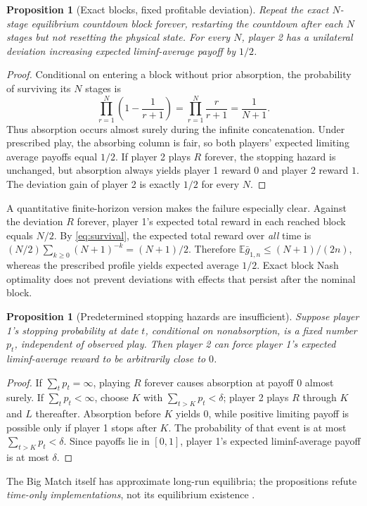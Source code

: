 \documentclass[11pt,a4paper]{article}
\numberwithin{equation}{section}
\newtheorem{proposition}[theorem]{Proposition}
\theoremstyle{definition}
\theoremstyle{remark}
\newcommand{\E}{\mathbb E}
\begin{document}
\begin{proposition}[Exact blocks, fixed profitable deviation]
\label{prop:bigmatch}
Repeat the exact $N$-stage equilibrium countdown block forever, restarting
the countdown after each $N$ stages but not resetting the physical state.
For every $N$, player 2 has a unilateral deviation increasing expected
liminf-average payoff by $1/2$.
\end{proposition}
\begin{proof}
Conditional on entering a block without prior absorption, the probability
of surviving its $N$ stages is
\begin{equation}\label{eq:survival}
 \prod_{r=1}^N\left(1-\frac1{r+1}\right)
 =\prod_{r=1}^N\frac r{r+1}=\frac1{N+1}.
\end{equation}
Thus absorption occurs almost surely during the infinite concatenation.
Under prescribed play, the absorbing column is fair, so both players'
expected limiting average payoffs equal $1/2$. If player 2 plays $R$
forever, the stopping hazard is unchanged, but absorption always yields
player 1 reward $0$ and player 2 reward $1$. The deviation gain of player 2
is exactly $1/2$ for every $N$.
\end{proof}
A quantitative finite-horizon version makes the failure especially clear.
Against the deviation $R$ forever, player 1's expected total reward in
each reached block equals $N/2$. By \eqref{eq:survival}, the expected total
reward over \emph{all} time is $(N/2)\sum_{k\ge0}(N+1)^{-k}=(N+1)/2$.
Therefore $\E\bar g_{1,n}\le(N+1)/(2n)$, whereas the prescribed
profile yields expected average $1/2$. Exact block Nash optimality does
not prevent deviations with effects that persist after the nominal block.

\begin{proposition}[Predetermined stopping hazards are insufficient]
\label{prop:hazard}
Suppose player 1's stopping probability at date $t$, conditional on
nonabsorption, is a fixed number $p_t$, independent of observed play.
Then player 2 can force player 1's \emph{expected liminf-average reward}
to be arbitrarily close to $0$.
\end{proposition}
\begin{proof}
If $\sum_t p_t=\infty$, playing $R$ forever causes absorption at payoff
$0$ almost surely. If $\sum_t p_t<\infty$, choose $K$ with
$\sum_{t>K}p_t<\delta$; player 2 plays $R$ through $K$ and $L$
thereafter. Absorption before $K$ yields $0$, while positive limiting
payoff is possible only if player 1 stops after $K$. The probability of
that event is at most $\sum_{t>K}p_t<\delta$. Since payoffs lie in
$[0,1]$, player 1's expected liminf-average payoff is at most $\delta$.
\end{proof}
The Big Match itself has approximate long-run equilibria; the propositions
refute \emph{time-only implementations}, not its equilibrium existence
\cite{bigmatchspace}.
\end{document}

